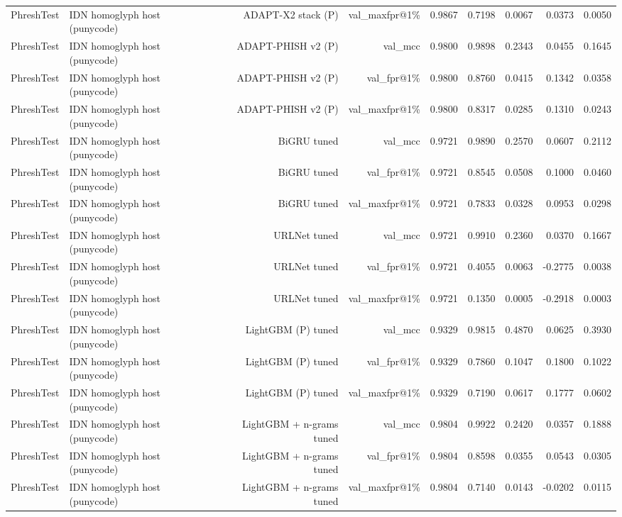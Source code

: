 \begin{table}[t]
\begin{tabular}{llrrrrrrr}
PhreshTest & IDN homoglyph host (punycode) & ADAPT-X2 stack (P) & val\_maxfpr@1\% & 0.9867 & 0.7198 & 0.0067 & 0.0373 & 0.0050 \\
PhreshTest & IDN homoglyph host (punycode) & ADAPT-PHISH v2 (P) & val\_mcc & 0.9800 & 0.9898 & 0.2343 & 0.0455 & 0.1645 \\
PhreshTest & IDN homoglyph host (punycode) & ADAPT-PHISH v2 (P) & val\_fpr@1\% & 0.9800 & 0.8760 & 0.0415 & 0.1342 & 0.0358 \\
PhreshTest & IDN homoglyph host (punycode) & ADAPT-PHISH v2 (P) & val\_maxfpr@1\% & 0.9800 & 0.8317 & 0.0285 & 0.1310 & 0.0243 \\
PhreshTest & IDN homoglyph host (punycode) & BiGRU tuned & val\_mcc & 0.9721 & 0.9890 & 0.2570 & 0.0607 & 0.2112 \\
PhreshTest & IDN homoglyph host (punycode) & BiGRU tuned & val\_fpr@1\% & 0.9721 & 0.8545 & 0.0508 & 0.1000 & 0.0460 \\
PhreshTest & IDN homoglyph host (punycode) & BiGRU tuned & val\_maxfpr@1\% & 0.9721 & 0.7833 & 0.0328 & 0.0953 & 0.0298 \\
PhreshTest & IDN homoglyph host (punycode) & URLNet tuned & val\_mcc & 0.9721 & 0.9910 & 0.2360 & 0.0370 & 0.1667 \\
PhreshTest & IDN homoglyph host (punycode) & URLNet tuned & val\_fpr@1\% & 0.9721 & 0.4055 & 0.0063 & -0.2775 & 0.0038 \\
PhreshTest & IDN homoglyph host (punycode) & URLNet tuned & val\_maxfpr@1\% & 0.9721 & 0.1350 & 0.0005 & -0.2918 & 0.0003 \\
PhreshTest & IDN homoglyph host (punycode) & LightGBM (P) tuned & val\_mcc & 0.9329 & 0.9815 & 0.4870 & 0.0625 & 0.3930 \\
PhreshTest & IDN homoglyph host (punycode) & LightGBM (P) tuned & val\_fpr@1\% & 0.9329 & 0.7860 & 0.1047 & 0.1800 & 0.1022 \\
PhreshTest & IDN homoglyph host (punycode) & LightGBM (P) tuned & val\_maxfpr@1\% & 0.9329 & 0.7190 & 0.0617 & 0.1777 & 0.0602 \\
PhreshTest & IDN homoglyph host (punycode) & LightGBM + n-grams tuned & val\_mcc & 0.9804 & 0.9922 & 0.2420 & 0.0357 & 0.1888 \\
PhreshTest & IDN homoglyph host (punycode) & LightGBM + n-grams tuned & val\_fpr@1\% & 0.9804 & 0.8598 & 0.0355 & 0.0543 & 0.0305 \\
PhreshTest & IDN homoglyph host (punycode) & LightGBM + n-grams tuned & val\_maxfpr@1\% & 0.9804 & 0.7140 & 0.0143 & -0.0202 & 0.0115 \\

\end{tabular}
\end{table}
